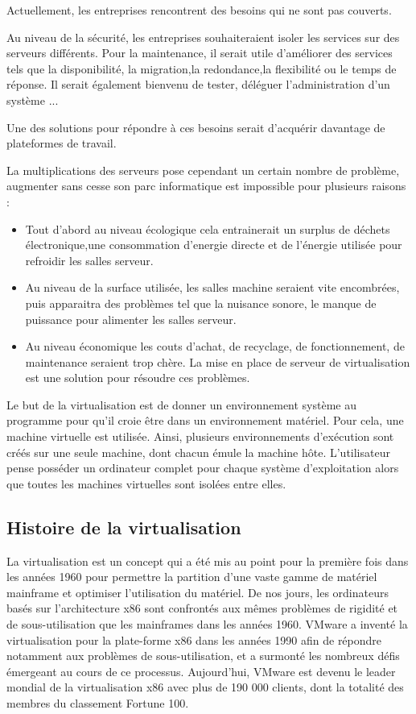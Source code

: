 Actuellement, les entreprises rencontrent des besoins qui ne sont
pas couverts.

Au niveau de la sécurité, les entreprises souhaiteraient isoler les
services sur des serveurs différents. Pour la maintenance, il serait
utile d'améliorer des services tels que la disponibilité, la migration,la redondance,la flexibilité ou le temps de réponse. Il serait également bienvenu de tester, déléguer l'administration d'un système ...


Une des solutions pour répondre à ces besoins serait d'acquérir davantage de plateformes de travail.


La multiplications des serveurs pose cependant un certain nombre
de problème, augmenter sans cesse son parc informatique est impossible
pour plusieurs raisons : 
\begin{itemize}
\item Tout d'abord au niveau écologique cela entrainerait un surplus de déchets électronique,une consommation d'energie directe et de l'énergie utilisée pour refroidir les salles serveur.
\item Au niveau de la surface utilisée, les salles machine seraient vite encombrées, puis apparaitra des problèmes tel que la nuisance sonore, le manque de puissance pour alimenter les salles serveur. 
\item Au niveau économique les couts d'achat, de recyclage, de fonctionnement, de maintenance seraient trop chère. La mise en place de serveur de virtualisation est une solution pour résoudre ces problèmes.
\end{itemize}

Le but de la virtualisation est de donner un environnement système
au programme pour qu'il croie être dans un environnement
matériel. Pour cela, une machine virtuelle est utilisée. Ainsi, plusieurs
environnements d'exécution sont créés sur une seule
machine, dont chacun émule la machine hôte. L'utilisateur
pense posséder un ordinateur complet pour chaque système d'exploitation
alors que toutes les machines virtuelles sont isolées entre elles.

\subsection{Histoire de la virtualisation}

La virtualisation est un concept qui a été mis au point pour la première
fois dans les années 1960 pour permettre la partition d'une vaste gamme de matériel mainframe et optimiser l'utilisation du matériel. De nos jours, les ordinateurs basés sur l'architecture x86 sont confrontés aux mêmes problèmes de rigidité et de sous-utilisation que les mainframes dans les années 1960. VMware a inventé la virtualisation pour la plate-forme x86 dans les années 1990 afin de répondre notamment aux problèmes de sous-utilisation, et a surmonté les nombreux défis émergeant au cours de ce processus. Aujourd'hui, VMware est devenu le leader mondial de la virtualisation x86 avec plus de 190 000 clients, dont la totalité des membres du classement Fortune 100.
\newpage
